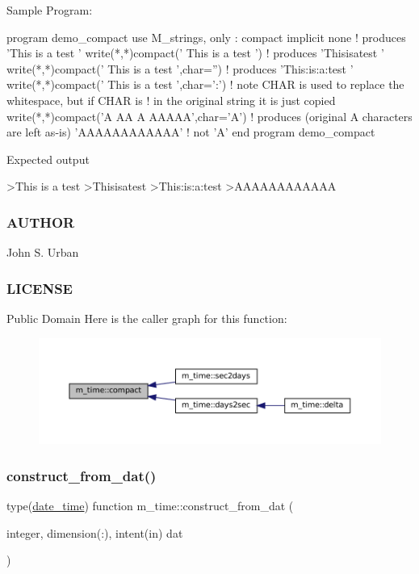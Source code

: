 \begin{DoxyVerb}Sample Program:

 program demo_compact
 use M_strings, only : compact
 implicit none
 ! produces 'This is a test               '
 write(*,*)compact('  This     is      a     test  ')
 ! produces 'Thisisatest                  '
 write(*,*)compact('  This     is      a     test  ',char='')
 ! produces 'This:is:a:test               '
 write(*,*)compact('  This     is      a     test  ',char=':')
 ! note CHAR is used to replace the whitespace, but if CHAR is
 ! in the original string it is just copied
 write(*,*)compact('A  AA    A   AAAAA',char='A')
 ! produces (original A characters are left as-is) 'AAAAAAAAAAAA'
 ! not 'A'
 end program demo_compact

Expected output

 >This is a test
 >Thisisatest
 >This:is:a:test
 >AAAAAAAAAAAA
\end{DoxyVerb}
 \subsubsection*{A\+U\+T\+H\+OR}

John S. Urban \subsubsection*{L\+I\+C\+E\+N\+SE}

Public Domain Here is the caller graph for this function\+:\nopagebreak
\begin{figure}[H]
\begin{center}
\leavevmode
\includegraphics[width=350pt]{namespacem__time_a7dd8bfae3ed8ba85bf4de75bf120fe89_icgraph}
\end{center}
\end{figure}
\mbox{\label{namespacem__time_a6f7d20403f29656febb82306aa064134}} 
\subsubsection{\texorpdfstring{construct\+\_\+from\+\_\+dat()}{construct\_from\_dat()}}
{\footnotesize\ttfamily type(\mbox{\hyperlink{structm__time_1_1date__time}{date\+\_\+time}}) function m\+\_\+time\+::construct\+\_\+from\+\_\+dat (\begin{DoxyParamCaption}\item[{integer, dimension(\+:), intent(in)}]{dat }\end{DoxyParamCaption})\hspace{0.3cm}{\ttfamily [private]}}



